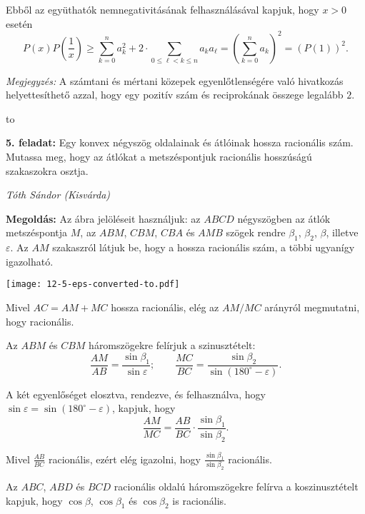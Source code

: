 \documentclass[a4paper,10pt]{article}
\newcommand{\ki}[2]{\hfill {\it #1 (#2)}\medskip}
\newcommand{\vonal}{\hbox to \hsize{\hskip2truecm\hrulefill\hskip2truecm}}
\begin{document}
\noindent Ebből az együthatók nemnegativitásának felhasználásával kapjuk, hogy $x>0$ esetén
\[P(x)P\left(\frac1x\right)\geq\sum_{k=0}^na_k^2+2\cdot\sum_{0\leq \ell<k\leq n}a_ka_\ell=\left(\sum_{k=0}^na_k\right)^2=(P(1))^2.\]

\medskip

\emph{Megjegyzés:} A számtani és mértani közepek egyenlőtlenségére való hivatkozás helyettesíthető azzal, hogy egy pozitív szám és reciprokának összege legalább $2$.

\vonal

{\bf 5. feladat: } Egy konvex négyszög oldalainak és átlóinak
hossza racionális szám. Mutassa meg, hogy az átlókat a metszéspontjuk
racionális hosszúságú szakaszokra osztja.

\ki{Tóth Sándor}{Kisvárda}\medskip

{\bf Megoldás:}  Az ábra jelöléseit használjuk: az $ABCD$ négyszögben
az átlók metszéspontja $M$, az $ABM$, $CBM$, $CBA$ és $AMB$ szögek rendre
$\beta_1$, $\beta_2$, $\beta$, illetve $\varepsilon$. Az $AM$ szakaszról látjuk
be, hogy a hossza racionális szám, a többi ugyanígy igazolható.

\begin{center}
\texttt{[image: 12-5-eps-converted-to.pdf]}
\end{center}

\noindent Mivel $AC=AM+MC$ hossza racionális, elég az $AM/MC$ arányról megmutatni, hogy
racionális. 

\smallskip

\noindent Az $ABM$ és $CBM$ háromszögekre felírjuk a szinusztételt:
\[\frac{AM}{AB}=\frac{\sin\beta_1}{\sin\varepsilon};\qquad \frac{MC}{
BC}=\frac{\sin\beta_2}{\sin(180^\circ-\varepsilon)}.\]

\smallskip

\noindent A két egyenlőséget elosztva, rendezve, és felhasználva, hogy
$\sin\varepsilon=\sin(180^\circ-\varepsilon)$, kapjuk, hogy
\[\frac{AM}{MC}=\frac{AB}{BC}\cdot\frac{\sin\beta_1}{\sin\beta_2}.\]

\smallskip

\noindent Mivel $\displaystyle\frac{AB}{BC}$ racionális, ezért elég igazolni, hogy
$\displaystyle\frac{\sin\beta_1}{\sin\beta_2}$ racionális.

\smallskip

\noindent Az $ABC$, $ABD$ és $BCD$ racionális oldalú háromszögekre felírva a
koszinusztételt kapjuk, hogy $\cos\beta$, $\cos\beta_1$ és $\cos\beta_2$ is racionális.  
\end{document}
